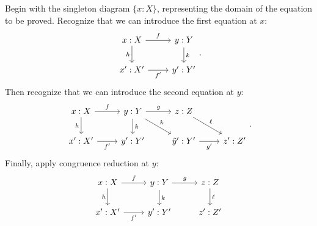 \documentclass[11pt]{article}
\numberwithin{equation}{section}
\begin{document}
\begin{example}
  Begin with the singleton diagram $\{x: X\}$, representing the domain of the
  equation to be proved. Recognize that we can introduce the first equation at
  $x$:
  \begin{equation*}
    \begin{tikzcd}
      {x: X} & {y: Y} \\
      {x': X'} & {y': Y'}
      \arrow["f", from=1-1, to=1-2]
      \arrow["h"', from=1-1, to=2-1]
      \arrow["k", from=1-2, to=2-2]
      \arrow["{f'}"', from=2-1, to=2-2]
    \end{tikzcd}.
  \end{equation*}
  Then recognize that we can introduce the second equation at $y$:
  \begin{equation*}
    \begin{tikzcd}
      {x: X} & {y: Y} & {z:Z} & \\
      {x': X'} & {y': Y'} & {\tilde y': Y'} & {z': Z'}
      \arrow["f", from=1-1, to=1-2]
      \arrow["h"', from=1-1, to=2-1]
      \arrow["g", from=1-2, to=1-3]
      \arrow["k", from=1-2, to=2-2]
      \arrow["k", from=1-2, to=2-3]
      \arrow["\ell", from=1-3, to=2-4]
      \arrow["{f'}"', from=2-1, to=2-2]
      \arrow["{g'}"', from=2-3, to=2-4]
    \end{tikzcd}.
  \end{equation*}
  Finally, apply congruence reduction at $y$:
  \begin{equation*}
    \begin{tikzcd}
      {x: X} & {y: Y} & {z: Z} \\
      {x': X'} & {y': Y'} & {z': Z'}
      \arrow["f", from=1-1, to=1-2]
      \arrow["h"', from=1-1, to=2-1]
      \arrow["g", from=1-2, to=1-3]
      \arrow["k", from=1-2, to=2-2]
      \arrow["\ell", from=1-3, to=2-3]
      \arrow["{f'}"', from=2-1, to=2-2]

\end{tikzcd}
\end{equation*}
\end{example}
\end{document}
